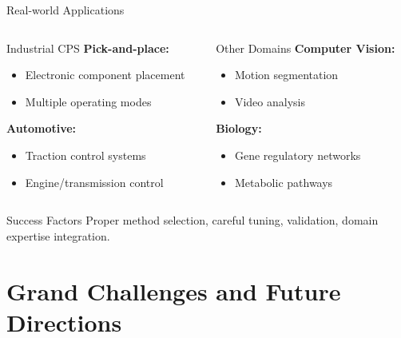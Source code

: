 \documentclass[aspectratio=169]{beamer}
\begin{document}
\begin{frame}{Real-world Applications}
\begin{columns}[t]
\begin{column}{0.5\textwidth}
\begin{block}{Industrial CPS}
\textbf{Pick-and-place:} \cite{juloski2004data}
\begin{itemize}
\item Electronic component placement
\item Multiple operating modes
\end{itemize}

\textbf{Automotive:} \cite{borrelli2006mpc}
\begin{itemize}
\item Traction control systems
\item Engine/transmission control
\end{itemize}
\end{block}
\end{column}
\begin{column}{0.5\textwidth}
\begin{block}{Other Domains}
\textbf{Computer Vision:}
\begin{itemize}
\item Motion segmentation
\item Video analysis
\end{itemize}

\textbf{Biology:} \cite{ferrari2007hybrid}
\begin{itemize}
\item Gene regulatory networks
\item Metabolic pathways
\end{itemize}
\end{block}
\end{column}
\end{columns}

\vspace{0.3cm}
\begin{exampleblock}{Success Factors}
Proper method selection, careful tuning, validation, domain expertise integration.
\end{exampleblock}
\end{frame}

\section{Grand Challenges and Future Directions}
\end{document}
